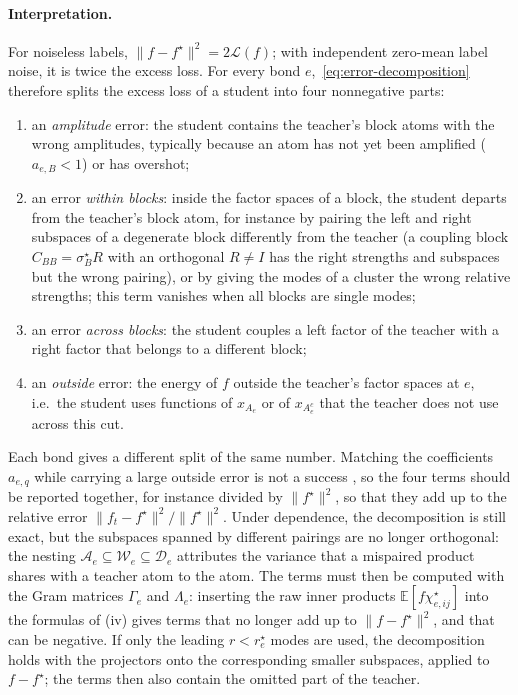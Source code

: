 \documentclass[11pt]{article}
\newcommand{\E}{\mathbb{E}}
\newcommand{\norm}[1]{\lVert #1\rVert}
\theoremstyle{definition}
\numberwithin{equation}{section}
\begin{document}
\paragraph{Interpretation.}
For noiseless labels, $\norm{f-f^\star}^2=2\mathcal L(f)$; with independent zero-mean label noise, it is twice the excess loss. For every bond $e$,~\eqref{eq:error-decomposition} therefore splits the excess loss of a student into four nonnegative parts:
\begin{enumerate}[label=(\alph*),nosep]
\item an \emph{amplitude} error: the student contains the teacher's block atoms with the wrong amplitudes, typically because an atom has not yet been amplified ($a_{e,B}<1$) or has overshot;
\item an error \emph{within blocks}: inside the factor spaces of a block, the student departs from the teacher's block atom, for instance by pairing the left and right subspaces of a degenerate block differently from the teacher (a coupling block $C_{BB}=\sigma^\star_BR$ with an orthogonal $R\neq I$ has the right strengths and subspaces but the wrong pairing), or by giving the modes of a cluster the wrong relative strengths; this term vanishes when all blocks are single modes;
\item an error \emph{across blocks}: the student couples a left factor of the teacher with a right factor that belongs to a different block;
\item an \emph{outside} error: the energy of $f$ outside the teacher's factor spaces at $e$, i.e.\ the student uses functions of $x_{A_e}$ or of $x_{A_e^c}$ that the teacher does not use across this cut.
\end{enumerate}
Each bond gives a different split of the same number. Matching the coefficients $a_{e,q}$ while carrying a large outside error is not a success \citep[Section~7.1]{hfl_surrogate}, so the four terms should be reported together, for instance divided by $\norm{f^\star}^2$, so that they add up to the relative error $\norm{f_t-f^\star}^2/\norm{f^\star}^2$. Under dependence, the decomposition is still exact, but the subspaces spanned by different pairings are no longer orthogonal: the nesting $\mathcal A_e\subseteq\mathcal W_e\subseteq\mathcal D_e$ attributes the variance that a mispaired product shares with a teacher atom to the atom. The terms must then be computed with the Gram matrices $\Gamma_e$ and $\Lambda_e$: inserting the raw inner products $\E[f\chi^\star_{e,ij}]$ into the formulas of (iv) gives terms that no longer add up to $\norm{f-f^\star}^2$, and that can be negative. If only the leading $r<r^\star_e$ modes are used, the decomposition holds with the projectors onto the corresponding smaller subspaces, applied to $f-f^\star$; the terms then also contain the omitted part of the teacher.
\end{document}
